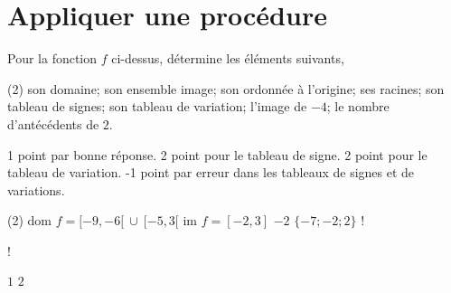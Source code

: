 \documentclass[a4paper, 12pt, parskip=half-]{scrartcl}
\begin{document}
\section*{ Appliquer une procédure}
\begin{exercise}[points=10]
    \begin{center}
        
    \end{center}
    Pour la fonction $f$ ci-dessus, détermine les éléments suivants,
    \begin{tasks}(2)
        \task son domaine;
        \task son ensemble image;
        \task son ordonnée à l'origine;
        \task ses racines;
        \task son tableau de signes;
        \task son tableau de variation;
        \task l'image de $-4$;
        \task le nombre d'antécédents de $2$.
    \end{tasks}
\end{exercise}
\begin{solution}
    1 point par bonne réponse.
    2 point pour le tableau de signe.
    2 point pour le tableau de variation.
    -1 point par erreur dans les tableaux de signes et de variations.
    \begin{tasks}(2)
        \task $\textrm{dom }f=[-9,-6[~\cup~[-5,3[$
        \task $\textrm{im }f=[-2,3]$
        \task $-2$
        \task $\lbrace -7;-2;2 \rbrace$
        \task!
        \task!
        \task $1$
        \task $2$
    \end{tasks}
\end{solution}
\end{document}
